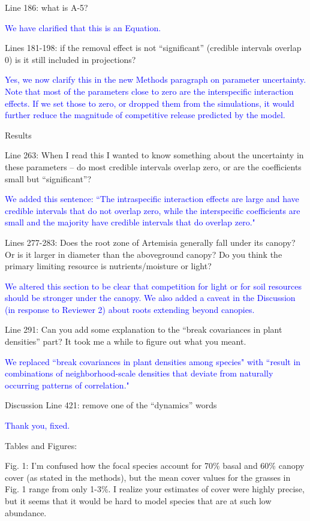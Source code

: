 \documentclass[12pt]{article}
\newcommand{\response}{\textcolor{blue}}
\begin{document}
Line 186: what is A-5?

\response{We have clarified that this is an Equation.}

Lines 181-198: if the removal effect is not “significant” (credible intervals overlap 0) is it still included in projections?

\response{Yes, we now clarify this in the new Methods paragraph on parameter uncertainty. Note that most of the parameters close
to zero are the interspecific interaction effects. If we set those to zero, or dropped them from the simulations, it would further reduce the 
magnitude of competitive release predicted by the model.}


Results

Line 263:  When I read this I wanted to know something about the uncertainty in these parameters – do most credible intervals overlap zero, or are the coefficients small but “significant”?

\response{We added this sentence: ``The intraspecific interaction effects are large and have credible intervals that do not overlap zero, while the interspecific coefficients are small and the majority have credible intervals that do overlap zero." }

Lines 277-283: Does the root zone of Artemisia generally fall under its canopy? Or is it larger in diameter than the aboveground canopy? Do you think the primary limiting resource is nutrients/moisture or light?

\response{We altered this section to be clear that competition for light or for soil resources should be stronger under the canopy. We also added a caveat in the Discussion (in response to Reviewer 2) about roots extending beyond canopies. }

Line 291: Can you add some explanation to the “break covariances in plant densities” part? It took me a while to figure out what you meant. 

\response{We replaced ``break covariances in plant densities among species" with ``result in combinations of neighborhood-scale densities that deviate from naturally occurring patterns of correlation."}

Discussion
Line 421: remove one of the “dynamics” words 

\response{Thank you, fixed.}

Tables and Figures:

Fig. 1: I’m confused how the focal species account for 70\% basal and 60\% canopy cover (as stated in the methods), but the mean cover values for the grasses in Fig. 1 range from only 1-3\%. I realize your estimates of cover were highly precise, but it seems that it would be hard to model species that are at such low abundance.
\end{document}
